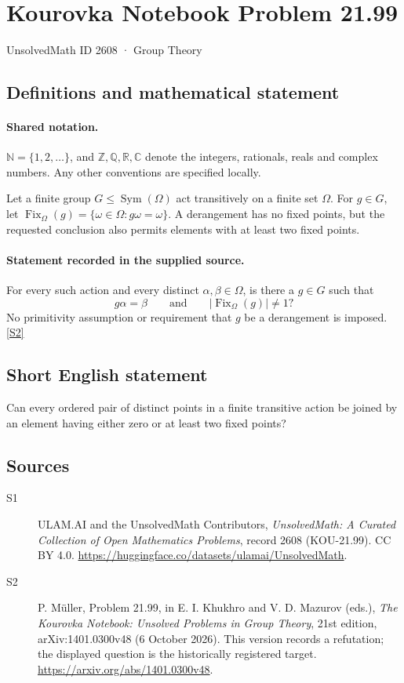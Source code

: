 \documentclass[11pt]{article}
\newcommand{\sref}[2]{\hyperlink{source:#1:#2}{[S#2]}}
\begin{document}
\setcounter{section}{2607}
\section{Kourovka Notebook Problem 21.99}\label{2608}
{\small\sffamily UnsolvedMath ID 2608 · Group Theory}
\subsection{Definitions and mathematical statement}

\paragraph{Shared notation.}$\mathbb N=\{1,2,\ldots\}$, and $\mathbb Z,\mathbb Q,\mathbb R,\mathbb C$ denote the integers, rationals, reals and complex numbers. Any other conventions are specified locally.


Let a finite group $G\leq\operatorname{Sym}(\Omega)$ act transitively on a finite set $\Omega$. For $g\in G$, let $\operatorname{Fix}_\Omega(g)=\{\omega\in\Omega:g\omega=\omega\}$. A derangement has no fixed points, but the requested conclusion also permits elements with at least two fixed points.
\paragraph{Statement recorded in the supplied source.}
For every such action and every distinct $\alpha,\beta\in\Omega$, is there a $g\in G$ such that
\[
 g\alpha=\beta\qquad\text{and}\qquad|\operatorname{Fix}_\Omega(g)|\ne1?
\]
No primitivity assumption or requirement that $g$ be a derangement is imposed. \sref{2608}{2}
\subsection{Short English statement}
Can every ordered pair of distinct points in a finite transitive action be joined by an element having either zero or at least two fixed points?
\subsection{Sources}
\begin{description}
\item[\hypertarget{source:2608:1}{S1}] ULAM.AI and the UnsolvedMath Contributors, \emph{UnsolvedMath: A Curated Collection of Open Mathematics Problems}, record 2608 (KOU-21.99). CC BY 4.0. \url{https://huggingface.co/datasets/ulamai/UnsolvedMath}.
\item[\hypertarget{source:2608:2}{S2}] P. Müller, Problem 21.99, in E. I. Khukhro and V. D. Mazurov (eds.), \emph{The Kourovka Notebook: Unsolved Problems in Group Theory}, 21st edition, arXiv:1401.0300v48 (6 October 2026). This version records a refutation; the displayed question is the historically registered target. \url{https://arxiv.org/abs/1401.0300v48}.
\end{description}
\label{end:2608}
\end{document}
